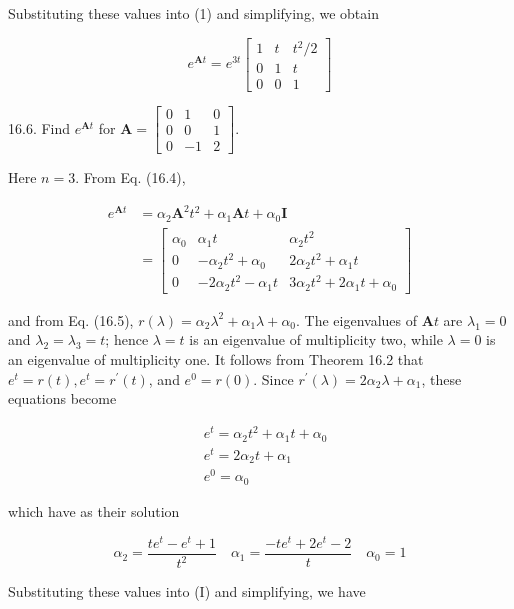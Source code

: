 \documentclass[10pt]{article}
\begin{document}
Substituting these values into (1) and simplifying, we obtain

$$
e^{\mathbf{A} t}=e^{3 t}\left[\begin{array}{ccc}
1 & t & t^{2} / 2 \\
0 & 1 & t \\
0 & 0 & 1
\end{array}\right]
$$

16.6. Find $e^{\mathbf{A} t}$ for $\mathbf{A}=\left[\begin{array}{rrr}0 & 1 & 0 \\ 0 & 0 & 1 \\ 0 & -1 & 2\end{array}\right]$.

Here $n=3$. From Eq. (16.4),


\begin{align*}
e^{\mathbf{A} t} & =\alpha_{2} \mathbf{A}^{2} t^{2}+\alpha_{1} \mathbf{A} t+\alpha_{0} \mathbf{I} \\
& =\left[\begin{array}{ccc}
\alpha_{0} & \alpha_{1} t & \alpha_{2} t^{2} \\
0 & -\alpha_{2} t^{2}+\alpha_{0} & 2 \alpha_{2} t^{2}+\alpha_{1} t \\
0 & -2 \alpha_{2} t^{2}-\alpha_{1} t & 3 \alpha_{2} t^{2}+2 \alpha_{1} t+\alpha_{0}
\end{array}\right] \tag{1}
\end{align*}


and from Eq. (16.5), $r(\lambda)=\alpha_{2} \lambda^{2}+\alpha_{1} \lambda+\alpha_{0}$. The eigenvalues of $\mathbf{A} t$ are $\lambda_{1}=0$ and $\lambda_{2}=\lambda_{3}=t$; hence $\lambda=t$ is an eigenvalue of multiplicity two, while $\lambda=0$ is an eigenvalue of multiplicity one. It follows from Theorem 16.2 that $e^{t}=r(t), e^{t}=r^{\prime}(t)$, and $e^{0}=r(0)$. Since $r^{\prime}(\lambda)=2 \alpha_{2} \lambda+\alpha_{1}$, these equations become

$$
\begin{aligned}
& e^{t}=\alpha_{2} t^{2}+\alpha_{1} t+\alpha_{0} \\
& e^{t}=2 \alpha_{2} t+\alpha_{1} \\
& e^{0}=\alpha_{0}
\end{aligned}
$$

which have as their solution

$$
\alpha_{2}=\frac{t e^{t}-e^{t}+1}{t^{2}} \quad \alpha_{1}=\frac{-t e^{t}+2 e^{t}-2}{t} \quad \alpha_{0}=1
$$

Substituting these values into (I) and simplifying, we have
\end{document}
